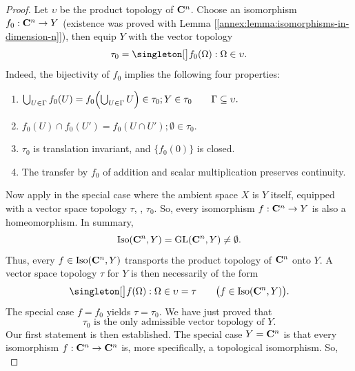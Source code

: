 \begin{proof}
Let $\upsilon$ be the product topology of $\mathbf{C}^n$. Choose an isomorphism $f_0: \mathbf{C}^n \to Y$ (existence was proved with Lemma %
[\ref{annex:lemma:isomorphisms-in-dimension-n}]), then equip $Y$ with the vector topology %
% 
\begin{equation}\label{annex:topology-in-finite-dimension:definition}
  \tau_0 = \set{f_0(\Omega)}{\Omega \in \upsilon}.
\end{equation}
% 
Indeed, the bijectivity of $f_0$ implies the following four properties:
% 
\begin{enumerate}[item-label=(\roman{enumi})]
  \item{
    $\bigcup_{U \in \Gamma} f_0(U) = f_0\Bigl(\bigcup_{U \in \Gamma} U \Bigr) \in \tau_0; Y\in \tau_0 %
    \qquad\Gamma \subset \upsilon.$
  }
  \item $f_0(U) \cap f_0(U') = f_0(U \cap U'); \emptyset \in \tau_0$.
  \item $\tau_0$ is translation invariant, and $\{f_0(0)\}$ is closed.
  \item The transfer by $f_0$ of addition and scalar multiplication preserves continuity.
\end{enumerate}
% 
Now apply  in the special case where the ambient space $X$ is $Y$ itself, equipped with a vector space topology %
$\tau$, \eg, $\tau_0$. So, every isomorphism $f:\mathbf{C}^n \to Y$ is also a homeomorphism. In summary, 
% 
\begin{equation}\label{annex:topology-in-finite-dimension:topological-isomorphisms-C-n-onto-Y}
  \operatorname{Iso}(\mathbf{C}^n, Y) = \operatorname{GL}(\mathbf{C}^n, Y) \neq \emptyset.
\end{equation}
% 
Thus, every $f\in \operatorname{Iso}(\mathbf{C}^n, Y)$ transports the product topology of $\mathbf{C}^n$ onto $Y$. A vector space topology $\tau$ for $Y$ is 
then necessarily of the form 
% 
\begin{equation}
  \set{f(\Omega)}{\Omega \in \upsilon} = \tau \qquad \bigl(f\in \Iso(\C^n, Y)\bigr).
\end{equation}
% 
The special case $f=f_0$ yields $\tau = \tau_0$. We have just proved that 
% 
\begin{equation}\label{annex:topology-in-finite-dimension:uniqueness-of-tau}
  \text{$\tau_0$ is the only admissible vector topology of $Y$.}
\end{equation}
% 
Our first statement is then established. The special case $Y = \mathbf{C}^n$ is that every isomorphism $f:\mathbf{C}^n \to \mathbf{C}^n$ is, more %
specifically, a topological isomorphism. So, 
% 
\begin{equation}\label{annex:topology-in-finite-dimension:automorphisms}

\end{equation}
\end{proof}
